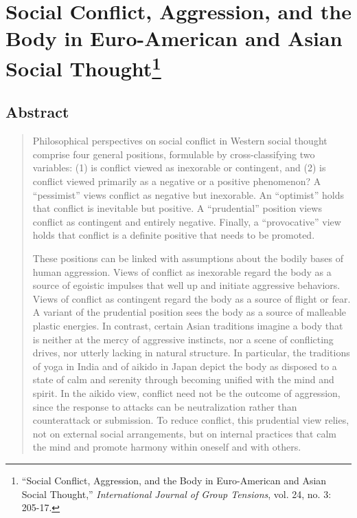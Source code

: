 \chapter[Social Conflict, Aggression, and the Body (1994)]{Social Conflict, Aggression, and the Body in Euro-American and Asian Social Thought\footnote{``Social Conflict, Aggression, and the Body in Euro-American and Asian Social Thought,'' \emph{International Journal of Group Tensions}, vol. 24, no. 3: 205-17.}}

\section*{Abstract}

\begin{quote}
\small
Philosophical perspectives on social conflict in Western social thought comprise four general positions, formulable by cross-classifying two variables: (1) is conflict viewed as inexorable or contingent, and (2) is conflict viewed primarily as a negative or a positive phenomenon? A ``pessimist'' views conflict as negative but inexorable. An ``optimist'' holds that conflict is inevitable but positive. A ``prudential'' position views conflict as contingent and entirely negative. Finally, a ``provocative'' view holds that conflict is a definite positive that needs to be promoted.

These positions can be linked with assumptions about the bodily bases of human aggression. Views of conflict as inexorable regard the body as a source of egoistic impulses that well up and initiate aggressive behaviors. Views of conflict as contingent regard the body as a source of flight or fear. A variant of the prudential position sees the body as a source of malleable plastic energies. In contrast, certain Asian traditions imagine a body that is neither at the mercy of aggressive instincts, nor a scene of conflicting drives, nor utterly lacking in natural structure. In particular, the traditions of yoga in India and of aikido in Japan depict the body as disposed to a state of calm and serenity through becoming unified with the mind and spirit. In the aikido view, conflict need not be the outcome of aggression, since the response to attacks can be neutralization rather than counterattack or submission. To reduce conflict, this prudential view relies, not on external social arrangements, but on internal practices that calm the mind and promote harmony within oneself and with others.
\end{quote}

